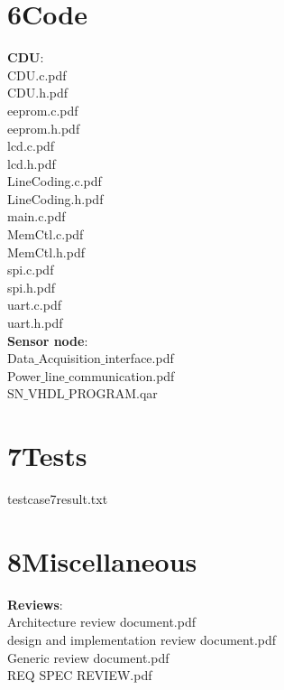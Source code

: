 \section{6Code}
\textbf{CDU}:\\
CDU.c.pdf\\
CDU.h.pdf\\
eeprom.c.pdf\\
eeprom.h.pdf\\
lcd.c.pdf\\
lcd.h.pdf\\
LineCoding.c.pdf\\
LineCoding.h.pdf\\
main.c.pdf\\
MemCtl.c.pdf\\
MemCtl.h.pdf\\
spi.c.pdf\\
spi.h.pdf\\
uart.c.pdf\\
uart.h.pdf\\
\textbf{Sensor node}:\\
Data$\_$Acquisition$\_$interface.pdf\\
Power$\_$line$\_$communication.pdf\\
SN$\_$VHDL$\_$PROGRAM.qar\\
\section{7Tests}
testcase7result.txt\\
\section{8Miscellaneous}
\textbf{Reviews}:\\
Architecture review document.pdf\\
design and implementation review document.pdf\\
Generic review document.pdf\\
REQ SPEC REVIEW.pdf\\